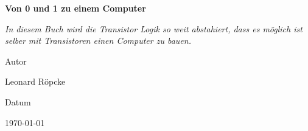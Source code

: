 \documentclass{book}
\newcommand{\AuthorName}{Leonard Röpcke}
\newcommand{\Subtitle}{In diesem Buch wird die Transistor Logik so weit abstahiert, dass es möglich ist selber mit Transistoren einen Computer zu bauen.}
\newcommand{\MyDate}{\today}
\begin{document}
\begin{titlepage}
  \centering
  {\scshape\LARGE \par}
  \vspace{2.5cm}
  {\huge\bfseries Von 0 und 1 zu einem Computer\par}
  \vspace{0.8cm}
  {\Large\itshape \Subtitle \par}
  \vfill
  {\Large Autor\par}
  {\Large \AuthorName \par}
  \vspace{1cm}
  {\Large Datum\par}
  {\Large \MyDate \par}
  \vfill
  \vspace{1cm}
  {\small }
\end{titlepage}
\tableofcontents
\newpage

\mainmatter

\end{document}
